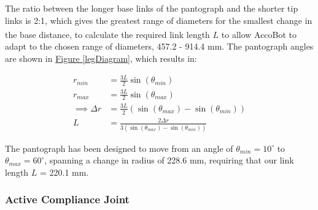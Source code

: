 \documentclass[11pt]{article}		%
\newcommand{\supercite}[1]{\textsuperscript{\cite{#1}}}		%
\newcommand{\figref}[1]{\hyperref[#1]{Figure \ref*{#1}}}    %
\begin{document}
				The ratio between the longer base links of the pantograph and the shorter tip links is 2:1, which gives the greatest range of diameters for the smallest change in the base distance\supercite{okada1987mogrer}, to calculate the required link length $L$ to allow AccoBot to adapt to the chosen range of diameters, 457.2 - 914.4 mm.
				The pantograph angles are shown in \figref{legDiagram}, which results in:
				
				\begin{align}
					r_{min} &= \frac{3L}{2} \sin \left( \theta_{min} \right) \label{rMin}
					\\
					r_{max} &= \frac{3L}{2} \sin \left( \theta_{max} \right)
					\\
					\implies \Delta r &= \frac{3L}{2} \left( \sin \left( \theta_{max} \right) - \sin \left( \theta_{min} \right) \right)
					\\
					L &= \frac{2 \Delta r}{3 \left( \sin \left( \theta_{max} \right) - \sin \left( \theta_{min} \right) \right)}
				\end{align}
							
				The pantograph has been designed to move from an angle of $\theta_{min} = 10^\circ$ to $\theta_{max} = 60^\circ$, spanning a change in radius of 228.6 mm, requiring that our link length $L$ = 220.1 mm.
			
			\subsubsection{Active Compliance Joint}
			
\end{document}
